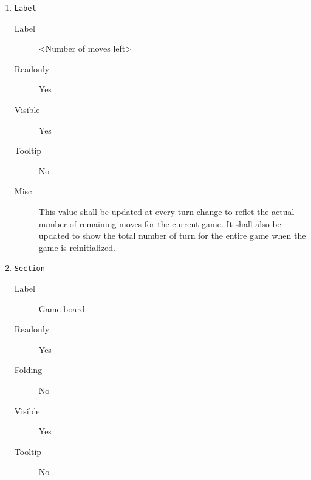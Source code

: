 \begin{enumerate}
    \item \texttt{Label}
              \begin{description}
                  \item[Label] <Number of moves left>
                  \item[Readonly] Yes
                  \item[Visible] Yes
                  \item[Tooltip] No
                  \item[Misc] This value shall be updated at every turn change
                              to reflet the actual number of remaining moves
                              for the current game. It shall also be updated
                              to show the total number of turn for the entire
                              game when the game is reinitialized.
              \end{description}

    \item \texttt{Section}
              \begin{description}
                  \item[Label] Game board
                  \item[Readonly] Yes
                  \item[Folding] No
                  \item[Visible] Yes
                  \item[Tooltip] No
              \end{description}


\end{enumerate}
